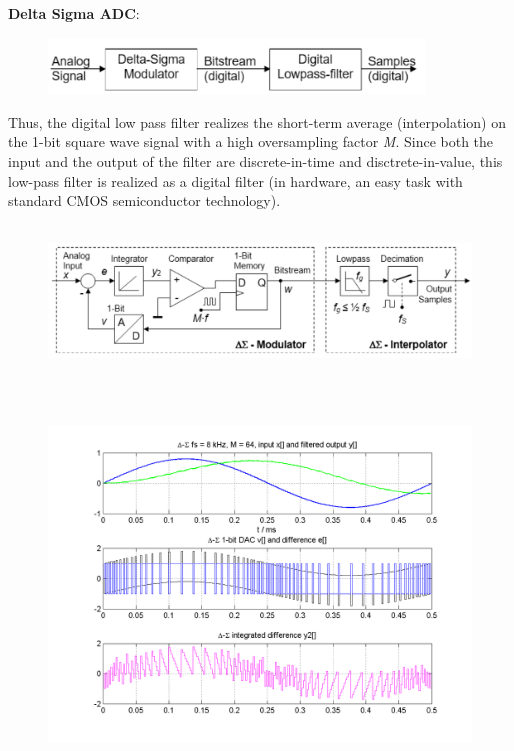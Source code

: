 {\rot\bf Delta Sigma ADC}:

    \begin{figure}[h]
    \centering
    \includegraphics[width=10cm, height=1.5cm]{Images/image178.png}
    \label{fig:Fig 136}
    \end{figure}
    
Thus, the digital low pass filter realizes the short-term average (interpolation) on the 1-bit square wave signal with a high oversampling factor \textit{M}. Since both the input and the output of the filter are discrete-in-time and disctrete-in-value, this low-pass filter is realized as a digital filter (in hardware, an easy task with standard CMOS semiconductor technology).

    \begin{figure}[h]
    \centering
    \includegraphics[width=15cm, height=4cm]{Images/image179.png}
    \label{fig:Fig 137}
    \end{figure}
    
    \begin{figure}[h]
    \centering
    \includegraphics[width=15cm, height=10cm]{Images/image43.png}
    \label{fig:Fig 138}
    \end{figure}

